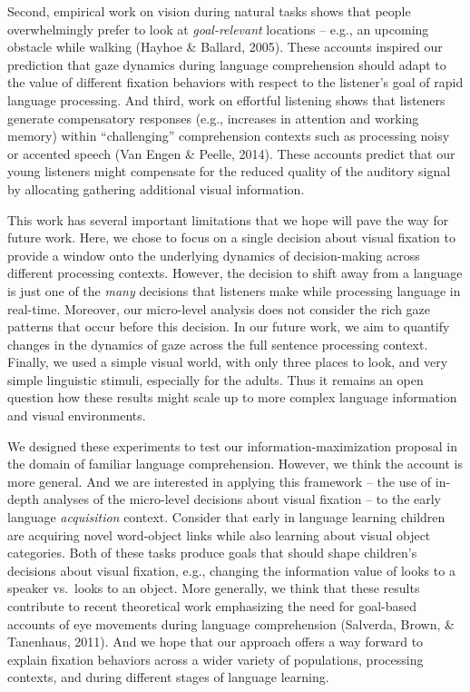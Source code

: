 \documentclass[10pt, letterpaper]{article}
\begin{document}
Second, empirical work on vision during natural tasks shows that people
overwhelmingly prefer to look at \emph{goal-relevant} locations -- e.g.,
an upcoming obstacle while walking (Hayhoe \& Ballard, 2005). These
accounts inspired our prediction that gaze dynamics during language
comprehension should adapt to the value of different fixation behaviors
with respect to the listener's goal of rapid language processing. And
third, work on effortful listening shows that listeners generate
compensatory responses (e.g., increases in attention and working memory)
within ``challenging'' comprehension contexts such as processing noisy
or accented speech (Van Engen \& Peelle, 2014). These accounts predict
that our young listeners might compensate for the reduced quality of the
auditory signal by allocating gathering additional visual information.

This work has several important limitations that we hope will pave the
way for future work. Here, we chose to focus on a single decision about
visual fixation to provide a window onto the underlying dynamics of
decision-making across different processing contexts. However, the
decision to shift away from a language is just one of the \emph{many}
decisions that listeners make while processing language in real-time.
Moreover, our micro-level analysis does not consider the rich gaze
patterns that occur before this decision. In our future work, we aim to
quantify changes in the dynamics of gaze across the full sentence
processing context. Finally, we used a simple visual world, with only
three places to look, and very simple linguistic stimuli, especially for
the adults. Thus it remains an open question how these results might
scale up to more complex language information and visual environments.

We designed these experiments to test our information-maximization
proposal in the domain of familiar language comprehension. However, we
think the account is more general. And we are interested in applying
this framework -- the use of in-depth analyses of the micro-level
decisions about visual fixation -- to the early language
\emph{acquisition} context. Consider that early in language learning
children are acquiring novel word-object links while also learning about
visual object categories. Both of these tasks produce goals that should
shape children's decisions about visual fixation, e.g., changing the
information value of looks to a speaker vs.~looks to an object. More
generally, we think that these results contribute to recent theoretical
work emphasizing the need for goal-based accounts of eye movements
during language comprehension (Salverda, Brown, \& Tanenhaus, 2011). And
we hope that our approach offers a way forward to explain fixation
behaviors across a wider variety of populations, processing contexts,
and during different stages of language learning.
\end{document}
